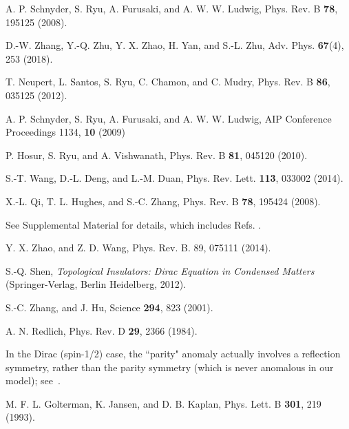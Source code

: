 \documentclass[twocolumn,prl,10pt,superscriptaddress]{revtex4}
\begin{document}
\begin{thebibliography}{99}
A. P. Schnyder, S. Ryu, A. Furusaki, and A. W. W. Ludwig, Phys. Rev. B {\bf 78}, 195125 (2008).

D.-W. Zhang, Y.-Q. Zhu, Y. X. Zhao, H. Yan, and S.-L. Zhu, Adv. Phys. {\bf 67}(4), 253 (2018).

T. Neupert, L. Santos, S. Ryu, C. Chamon, and C. Mudry, Phys. Rev. B {\bf 86}, 035125 (2012).


A. P. Schnyder, S. Ryu, A. Furusaki, and A. W. W. Ludwig, AIP Conference Proceedings 1134, {\bf 10} (2009)

P. Hosur, S. Ryu, and A. Vishwanath, Phys. Rev. B {\bf 81}, 045120 (2010).

S.-T. Wang, D.-L. Deng,  and L.-M. Duan, Phys. Rev. Lett. \textbf{113}, 033002 (2014).


X.-L. Qi, T. L. Hughes, and S.-C. Zhang,
Phys. Rev. B \textbf{78}, 195424 (2008).

 See Supplemental Material for details, which includes Refs. \cite{YXZhao2014,SQShen,Zhang,Redlich1984}.

 Y. X. Zhao, and Z. D. Wang, Phys. Rev. B. 89, 075111 (2014).

  S.-Q. Shen, \emph{Topological Insulators: Dirac Equation in Condensed
Matters} (Springer-Verlag, Berlin Heidelberg, 2012).

S.-C. Zhang, and J. Hu, Science \textbf{294}, 823 (2001).

 A. N. Redlich, Phys. Rev. D {\bf 29}, 2366 (1984).





 In the Dirac (spin-1/2) case, the ``parity" anomaly actually involves a reflection symmetry, rather than the parity symmetry (which is never anomalous in our model); see~\cite{SM}.


 M. F. L. Golterman, K. Jansen, and D. B. Kaplan, Phys. Lett. B {\bf 301}, 219 (1993).


\end{thebibliography}
\end{document}
